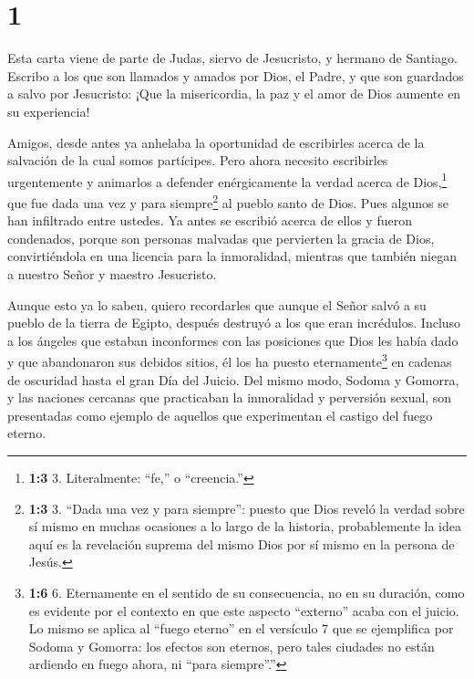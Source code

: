 \hypertarget{section}{%
\section{1}\label{section}}

 Esta carta viene de parte de Judas, siervo de Jesucristo, y
hermano de Santiago. Escribo a los que son llamados y amados por Dios,
el Padre, y que son guardados a salvo por Jesucristo:  ¡Que
la misericordia, la paz y el amor de Dios aumente en su experiencia!

 Amigos, desde antes ya anhelaba la oportunidad de
escribirles acerca de la salvación de la cual somos partícipes. Pero
ahora necesito escribirles urgentemente y animarlos a defender
enérgicamente la verdad acerca de Dios,\footnote{\textbf{1:3} 3.
  Literalmente: ``fe,'' o ``creencia.''} que fue dada una vez y para
siempre\footnote{\textbf{1:3} 3. ``Dada una vez y para siempre'': puesto
  que Dios reveló la verdad sobre sí mismo en muchas ocasiones a lo
  largo de la historia, probablemente la idea aquí es la revelación
  suprema del mismo Dios por sí mismo en la persona de Jesús.} al pueblo
santo de Dios.  Pues algunos se han infiltrado entre
ustedes. Ya antes se escribió acerca de ellos y fueron condenados,
porque son personas malvadas que pervierten la gracia de Dios,
convirtiéndola en una licencia para la inmoralidad, mientras que también
niegan a nuestro Señor y maestro Jesucristo.

 Aunque esto ya lo saben, quiero recordarles que aunque el
Señor salvó a su pueblo de la tierra de Egipto, después destruyó a los
que eran incrédulos.  Incluso a los ángeles que estaban
inconformes con las posiciones que Dios les había dado y que abandonaron
sus debidos sitios, él los ha puesto eternamente\footnote{\textbf{1:6}
  6. Eternamente en el sentido de su consecuencia, no en su duración,
  como es evidente por el contexto en que este aspecto ``externo'' acaba
  con el juicio. Lo mismo se aplica al ``fuego eterno'' en el versículo
  7 que se ejemplifica por Sodoma y Gomorra: los efectos son eternos,
  pero tales ciudades no están ardiendo en fuego ahora, ni ``para
  siempre''.''} en cadenas de oscuridad hasta el gran Día del Juicio.
 Del mismo modo, Sodoma y Gomorra, y las naciones cercanas
que practicaban la inmoralidad y perversión sexual, son presentadas como
ejemplo de aquellos que experimentan el castigo del fuego eterno.


